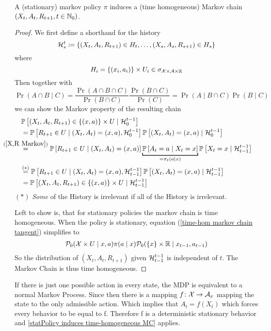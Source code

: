 \begin{prop}\label{statPolicy induces time-homogeneous MC}
	A (stationary) markov  policy \(\pi\) induces a (time homogeneous) Markov chain \((X_t,A_t,R_{t+1},t\in\mathbb{N}_0)\).
\end{prop}
\begin{proof} 
	We first define a shorthand for the history
	\[
		\mathcal{H}_s^t\coloneqq \{(X_t,A_t,R_{t+1})\in H_t,\dots,(X_s,A_s,R_{s+1})\in H_s \}
	\]
	where 
	\[
		H_i=\{(x_i,a_i)\}\times U_i \in \sigma_{\mathcal{X}\times\mathcal{A}\times\mathbb{R}}
	\]
	Then together with 
	\[
		\Pr(A\cap B \mid C)
		=\frac{\Pr(A\cap B\cap C)}{\Pr(B\cap C)}\frac{\Pr(B\cap C)}{\Pr(C)} 
		= \Pr(A\mid B\cap C)\Pr(B\mid C) 
	\]
	we can show the Markov property of the resulting chain
	\begin{align}
		&\Pr\left[(X_t,A_t,R_{t+1})\in\{(x,a)\}\times U \mid \cH_0^{t-1} \right] \nonumber \\
		&=\Pr\left[R_{t+1}\in U \mid (X_t, A_t)=(x,a), \cH_0^{t-1}\right]
		\Pr\left[(X_t, A_t)=(x,a)\mid\cH_0^{t-1}\right]
		\nonumber\\
		&\lxeq{(\ref{X,R Markov})}\Pr\left[R_{t+1}\in U \mid (X_t, A_t)=(x,a)\right]
		\underbracket[1pt]{\Pr\left[A_t=a \mid X_t=x\right]}_{=\pi_t(a\mid x)}
		\Pr\left[X_t=x\mid \cH_{t-1}^{t-1}\right]
		\label{time-hom markov chain tangent}\\
		&\lxeq{(*)}\Pr\left[R_{t+1}\in U \mid (X_t, A_t)=(x,a), \cH_{t-1}^{t-1}\right]
		\Pr\left[(X_t, A_t)=(x,a)\mid\cH_{t-1}^{t-1}\right]
		\nonumber\\
		&=\Pr\left[(X_t,A_t,R_{t+1})\in\{(x,a)\}\times U \mid \cH_{t-1}^{t-1} \right]
		\nonumber
	\end{align}
	\((*)\) \emph{Some} of the History is irrelevant if all of the History is irrelevant. 
	
	Left to show is, that for stationary policies the markov chain is time homogeneous. When the policy is stationary, equation (\ref{time-hom markov chain tangent}) simplifies to
	\begin{align*}
		\mathcal{P}_0(\mathcal{X}\times U \mid x,a)\pi(a\mid x)
		\mathcal{P}_0(\{x\}\times \mathbb{R} \mid x_{t-1}, a_{t-1})
	\end{align*}
	So the distribution of \((X_{t},A_{t},R_{t+1})\) given \(\mathcal{H}^{t-1}_{t-1}\) is independent of \(t\). The Markov Chain is thus time homogeneous.
\end{proof} 
\begin{remark} 
If there is just one possible action in every state, the MDP is equivalent to a normal Markov Process. 
Since then there is a mapping \(f\colon\mathcal{X}\to\mathcal{A}_x\) mapping the state to  the only admissible action. Which implies that \(A_t=f(X_t)\) which forces every behavior to be equal to f. Therefore f is a deterministic stationary behavior and \ref{statPolicy induces time-homogeneous MC} applies.  
\end{remark}

